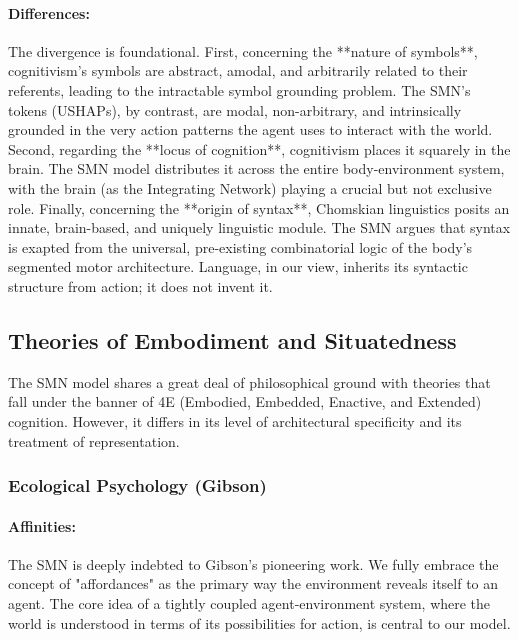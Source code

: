 \paragraph{Differences:} The divergence is foundational. First, concerning the **nature of symbols**, cognitivism's symbols are abstract, amodal, and arbitrarily related to their referents, leading to the intractable symbol grounding problem. The SMN's tokens (USHAPs), by contrast, are modal, non-arbitrary, and intrinsically grounded in the very action patterns the agent uses to interact with the world. Second, regarding the **locus of cognition**, cognitivism places it squarely in the brain. The SMN model distributes it across the entire body-environment system, with the brain (as the Integrating Network) playing a crucial but not exclusive role. Finally, concerning the **origin of syntax**, Chomskian linguistics posits an innate, brain-based, and uniquely linguistic module. The SMN argues that syntax is exapted from the universal, pre-existing combinatorial logic of the body's segmented motor architecture. Language, in our view, inherits its syntactic structure from action; it does not invent it.
\subsection{Theories of Embodiment and Situatedness}\label{subsec:comparison_embodiment}
The SMN model shares a great deal of philosophical ground with theories that fall under the banner of 4E (Embodied, Embedded, Enactive, and Extended) cognition. However, it differs in its level of architectural specificity and its treatment of representation.  \subsubsection{Ecological Psychology (Gibson)}\label{ssubsec:ecological}\paragraph{Affinities:} The SMN is deeply indebted to Gibson's pioneering work. We fully embrace the concept of "affordances" as the primary way the environment reveals itself to an agent. The core idea of a tightly coupled agent-environment system, where the world is understood in terms of its possibilities for action, is central to our model.
